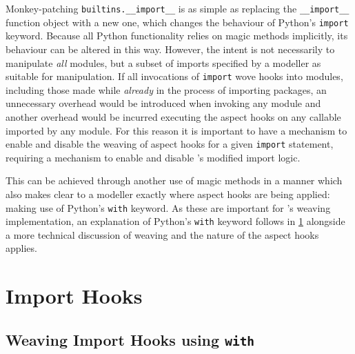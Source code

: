 Monkey-patching \lstinline{builtins.__import__} is as simple as replacing the
\lstinline{__import__} function object with a new one, which changes the
behaviour of Python's \lstinline{import} keyword. Because all Python
functionality relies on magic methods implicitly, its behaviour can be altered
in this way. However, the intent is not necessarily to manipulate \emph{all}
modules, but a subset of imports specified by a modeller as suitable for
manipulation. If all invocations of \lstinline{import} wove hooks into modules,
including those made while \emph{already} in the process of importing packages,
an unnecessary overhead would be introduced when invoking any module and another
overhead would be incurred executing the aspect hooks on any callable imported
by any module. For this reason it is important to have a mechanism to enable and
disable the weaving of aspect hooks for a given \lstinline{import} statement,
requiring a mechanism to enable and disable \pdsf{}'s modified import logic.

This can be achieved through another use of magic methods in a manner which also
makes clear to a modeller exactly where aspect hooks are being applied: making
use of Python's \lstinline{with} keyword. As these are important for \pdsf{}'s
weaving implementation, an explanation of Python's \lstinline{with} keyword
follows in \cref{sec:import_hooks} alongside a more technical discussion of
weaving and the nature of the aspect hooks \pdsf{} applies.



\section{Import Hooks}\label{sec:import_hooks}

\subsection{Weaving Import Hooks using \lstinline{with}}\label{subsec:pdsf3implementingimporthooks}



